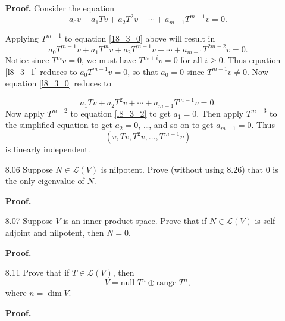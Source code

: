 \documentclass[9pt]{article}
\begin{document}
\begin{enumerate}
      \textbf{Proof.} Consider the equation
      \begin{equation} \label{l8_3_0}
         a_0v + a_1Tv + a_2T^2v + \cdots + a_{m-1}T^{m-1}v = 0.
      \end{equation}
      
      Applying $T^{m-1}$ to equation \eqref{18_3_0} above will result in
      \begin{equation} \label{l8_3_1}
         a_0T^{m-1}v + a_1T^mv + a_2T^{m+1}v + \cdots + a_{m-1}T^{2m-2}v = 0.
      \end{equation}
      Notice since $T^mv = 0$, we must have $T^{m + i}v = 0$ for all $i \ge 0$.
      Thus equation \eqref{l8_3_1} reduces to $a_0T^{m-1}v = 0$, so that
      $a_0 = 0$ since $T^{m-1}v \neq 0$. Now equation \eqref{l8_3_0} reduces to
      
      \begin{equation} \label{l8_3_2}
         a_1Tv + a_2T^2v + \cdots + a_{m-1}T^{m-1}v = 0.
      \end{equation}
      Now apply $T^{m-2}$ to equation \eqref{l8_3_2} to get $a_1 = 0$. Then
      apply $T^{m - 3}$ to the simplified equation to get $a_2 = 0$, \ldots,
      and so on to get $a_{m-1} = 0$. Thus 
               $$(v, Tv, T^2v, \ldots, T^{m-1}v)$$
               is linearly independent.
   \item[8.06] Suppose $N \in \mathcal{L}(V)$ is nilpotent. Prove (without
               using 8.26) that 0 is the only eigenvalue of $N$.

      \textbf{Proof.} 
   \item[8.07] Suppose $V$ is an inner-product space. Prove that if
               $N \in \mathcal{L}(V)$ is self-adjoint and nilpotent, then
               $N = 0$.

      \textbf{Proof.}   
   \item[8.11] Prove that if $T \in \mathcal{L}(V)$, then
               $$V = \text{null }T^n \oplus \text{range }T^n,$$
               where $n = \dim V$.

      \textbf{Proof.} 
\end{enumerate}
\end{document}
